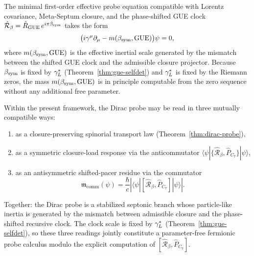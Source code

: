 \begin{theorem}\label{thm:dirac-probe}
The minimal first-order effective probe equation compatible with Lorentz
covariance, Meta-Septum closure, and the phase-shifted GUE clock
$\hat{\mathcal{R}}_\beta = \hat R_{\mathrm{GUE}}\,e^{i\pi\beta_{\mathrm{sym}}}$
takes the form
\[
 \bigl(i\gamma^\mu\partial_\mu
 - m(\beta_{\mathrm{sym}},\mathrm{GUE})\bigr)\psi = 0,
\]
where $m(\beta_{\mathrm{sym}},\mathrm{GUE})$ is the effective inertial scale generated
by the mismatch between the shifted GUE clock and the admissible closure
projector.
Because $\beta_{\mathrm{sym}}$ is fixed by $\gamma_L^*$ (Theorem~\ref{thm:gue-selfdet}) and
$\gamma_L^*$ is fixed by the Riemann zeros, the mass $m(\beta_{\mathrm{sym}},\mathrm{GUE})$
is in principle computable from the zero sequence without any additional
free parameter.
\end{theorem}


\begin{proposition}
\label{prop:three-compatible-readings}
Within the present framework, the Dirac probe may be read in three
mutually compatible ways:
\begin{enumerate}[label=(\roman*)]
 \item as a closure-preserving spinorial transport law
 (Theorem~\ref{thm:dirac-probe}),
 \item as a symmetric closure-load response via the anticommutator
 $\langle\psi|\{\hat{\mathcal{R}}_\beta,\hat P_{C_7}\}|\psi\rangle$,
 \item as an antisymmetric shifted-pacer residue via the commutator
 \[
 \mathfrak{m}_{\mathrm{comm}}(\psi)
 = \frac{\hbar}{c}
 \left|\langle\psi|
 [\hat{\mathcal{R}}_\beta,\hat P_{C_7}]|\psi\rangle
 \right|.
 \]
\end{enumerate}
Together: the Dirac probe is a stabilized septonic branch whose
particle-like inertia is generated by the mismatch between admissible
closure and the phase-shifted recursive clock.
The clock scale is fixed by $\gamma_L^*$ (Theorem~\ref{thm:gue-selfdet}),
so these three readings jointly constitute a parameter-free fermionic
probe calculus modulo the explicit computation of
$[\hat{\mathcal{R}}_\beta,\hat P_{C_7}]$.
\end{proposition}



